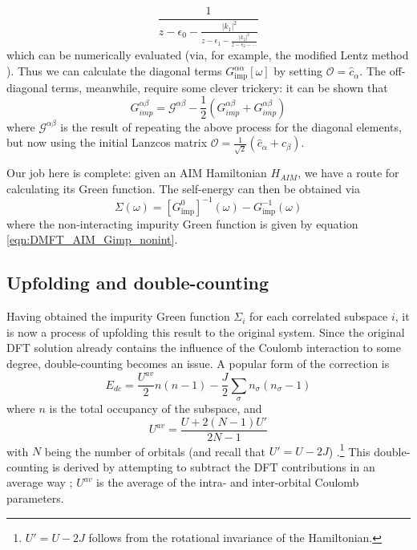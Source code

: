 \documentclass[10pt,a4paper,final]{article}
\begin{document}
%
\begin{equation}
\frac{1}{z-\epsilon_0-\frac{|k_1|^2}{z-\epsilon_1-\frac{|k_2|^2}{z-\epsilon_2 - \cdots}}}
\end{equation}
%
which can be numerically evaluated (via, for example, the modified Lentz method \cite{Press1992a}). Thus we can calculate the diagonal terms $G_\text{imp}^{\alpha\alpha}[\omega]$ by setting $\mathcal{O} = \hat c_\alpha$. The off-diagonal terms, meanwhile, require some clever trickery: it can be shown \cite{Dolfen2006a} that
%
\begin{equation}
G^{\alpha\beta}_{imp} = \mathcal{G}^{\alpha\beta} - \frac{1}{2}\left(G^{\alpha\beta}_{imp} + G^{\alpha\beta}_{imp}\right)
\end{equation}
%
where $\mathcal{G}^{\alpha\beta}$ is the result of repeating the above process for the diagonal elements, but now using the initial Lanzcos matrix $\mathcal{O} = \frac{1}{\sqrt{2}}\left(\hat c_\alpha + c_\beta\right)$.

Our job here is complete: given an AIM Hamiltonian $H_{AIM}$, we have a route for calculating its Green function. The self-energy can then be obtained via
%
\begin{equation}
\Sigma(\omega)=[G^0_\text{imp}]^{-1}(\omega)-G_\text{imp}^{-1}(\omega)
\end{equation}
%
where the non-interacting impurity Green function is given by equation \ref{eqn:DMFT_AIM_Gimp_nonint}.
\subsection{Upfolding and double-counting}
Having obtained the impurity Green function $\Sigma_i$ for each correlated subspace $i$, it is now a process of upfolding this result to the original system. Since the original DFT solution already contains the influence of the Coulomb interaction to some degree, double-counting becomes an issue. A popular form of the correction is
%
\begin{equation}
E_{dc} = \frac{U^{av}}{2}n\left(n - 1 \right)-\frac{J}{2}\sum_\sigma n_\sigma(n_\sigma-1)
\label{eqn:DMFT_Edc}
\end{equation}
%
where $n$ is the total occupancy of the subspace, and
%
\begin{equation}
U^{av} = \frac{U + 2(N-1)U'}{2N-1}
\end{equation}
%
with $N$ being the number of orbitals (and recall that $U' = U - 2J$) \cite{Pruschke2000a}.\footnote{$U' = U - 2J$ follows from the rotational invariance of the Hamiltonian.} This double-counting is derived by attempting to subtract the DFT contributions in an average way%
; $U^{av}$ is the average of the intra- and inter-orbital Coulomb parameters. %
\end{document}
